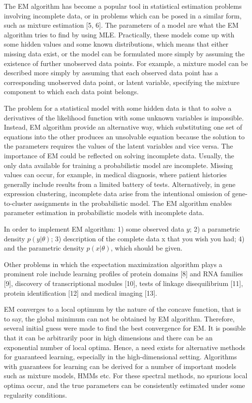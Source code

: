 \documentclass[onecolumn,12pt]{IEEEtran}
\begin{document}
The EM algorithm has become a popular tool in statistical estimation problems involving incomplete data, or in problems which can be posed in a similar form, such as mixture estimation [5, 6]. The parameters of a model are what the EM algorithm tries to find by using MLE. Practically, these models come up with some hidden values and some known distributions, which means that either missing data exist, or the model can be formulated more simply by assuming the existence of further unobserved data points. For example, a mixture model can be described more simply by assuming that each observed data point has a corresponding unobserved data point, or latent variable, specifying the mixture component to which each data point belongs.

The problem for a statistical model with some hidden data is that to solve a derivatives of the likelihood function with some unknown variables is impossible. Instead, EM algorithm provide an alternative way, which substituting one set of equations into the other produces an unsolvable equation because the solution to the parameters requires the values of the latent variables and vice versa.
The importance of EM could be reflected on solving incomplete data. Usually, the only data available for training a probabilistic model are incomplete. Missing values can occur, for example, in medical diagnosis, where patient histories generally include results from a limited battery of tests. Alternatively, in gene expression clustering, incomplete data arise from the intentional omission of gene-to-cluster assignments in the probabilistic model. The EM algorithm enables parameter estimation in probabilistic models with incomplete data.

In order to implement EM algorithm: 1) some observed data $y$; 2) a parametric density $p(y|\theta)$; 3) description of the complete data x that you wish you had; 4) and the parametric density $p(x|\theta)$, which should be given.

Other problems in which the expectation maximization algorithm plays a prominent role include learning profiles of protein domains [8] and RNA families [9], discovery of transcriptional modules [10], tests of linkage disequilibrium [11], protein identification [12] and medical imaging [13].

EM converges to a local optimum by the nature of the concave function, that is to say, the global minimum can not be obtained by EM algorithm. Therefore, several initial guess were made to find the best convergence for EM. It is possible that it can be arbitrarily poor in high dimensions and there can be an exponential number of local optima. Hence, a need exists for alternative methods for guaranteed learning, especially in the high-dimensional setting. Algorithms with guarantees for learning can be derived for a number of important models such as mixture models, HMMs etc. For these spectral methods, no spurious local optima occur, and the true parameters can be consistently estimated under some regularity conditions.
\end{document}
